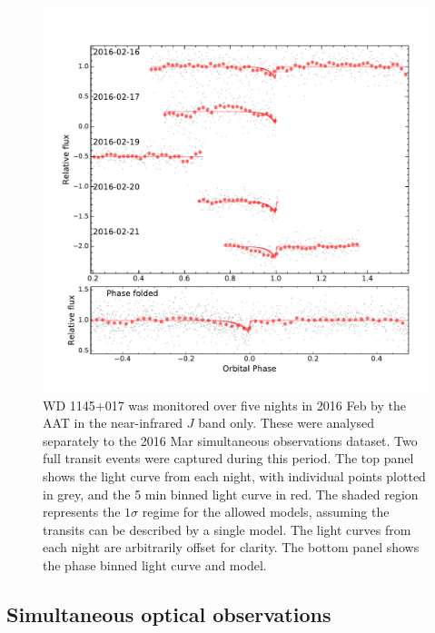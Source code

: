 \documentclass[useAMS,usenatbib]{mn2e}
\begin{document}


\begin{figure}
    \centering
    \includegraphics[width=15cm]{plots/AAT_feb.pdf}
    \caption{WD 1145+017 was monitored over five nights in 2016 Feb by the AAT in the near-infrared $J$ band only. These were analysed separately to the 2016 Mar simultaneous observations dataset. Two full transit events were captured during this period. The top panel shows the light curve from each night, with individual points plotted in grey, and the 5 min binned light curve in red. The shaded region represents the $1\sigma$ regime for the allowed models, assuming the transits can be described by a single model. The light curves from each night are arbitrarily offset for clarity. The bottom panel shows the phase binned light curve and model. }
    \label{fig:lc_201602}
\end{figure}


\subsection{Simultaneous optical observations}
\label{sec:simultaneous-optical}
\end{document}
